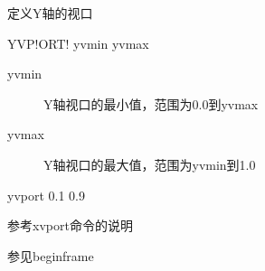 \label{cmd:yvport}

定义Y轴的视口

\begin{SACSTX}
YVP!ORT! yvmin yvmax
\end{SACSTX}

\begin{description}
\item [yvmin] Y轴视口的最小值，范围为0.0到yvmax
\item [yvmax] Y轴视口的最大值，范围为yvmin到1.0
\end{description}

\begin{SACDFT}
yvport 0.1 0.9
\end{SACDFT}

参考xvport命令的说明

参见beginframe
